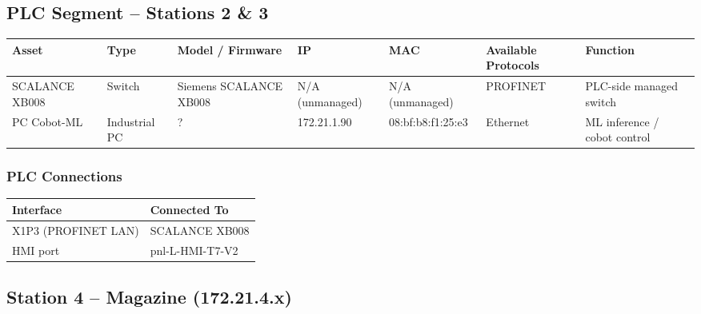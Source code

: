 \subsection{PLC Segment – Stations 2 \& 3}

\begin{adjustbox}{max width=\textwidth}
\begin{tabular}{lllllll}
\toprule
\textbf{Asset} & \textbf{Type} & \textbf{Model / Firmware} & \textbf{IP} & \textbf{MAC} & \textbf{Available Protocols} & \textbf{Function} \\
\midrule
SCALANCE XB008 & Switch        & Siemens SCALANCE XB008 & N/A (unmanaged) & N/A (unmanaged)   & PROFINET & PLC-side managed switch \\
PC Cobot-ML    & Industrial PC & ?                      & 172.21.1.90     & 08:bf:b8:f1:25:e3 & Ethernet & ML inference / cobot control \\
\bottomrule
\end{tabular}
\end{adjustbox}

\subsubsection{PLC Connections}

\begin{tabular}{ll}
\toprule
\textbf{Interface} & \textbf{Connected To} \\
\midrule
X1P3 (PROFINET LAN) & SCALANCE XB008 \\
HMI port            & pnl-L-HMI-T7-V2 \\
\bottomrule
\end{tabular}

\subsection{Station 4 – Magazine (172.21.4.x)}


